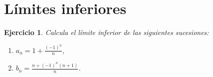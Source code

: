 \documentclass[11pt]{report}
\newtheorem{ex}{Ejercicio}
\begin{document}
\section{L\'imites inferiores}

\begin{ex}
  Calcula el límite inferior de las siguientes sucesiones:
  \begin{enumerate}
    \item \( a_n = 1 + \frac{(-1)^n}{n} \),
    \item \( b_n = \frac{n + (-1)^n (n+1)}{n} \).
  \end{enumerate}


\end{ex}
\end{document}
